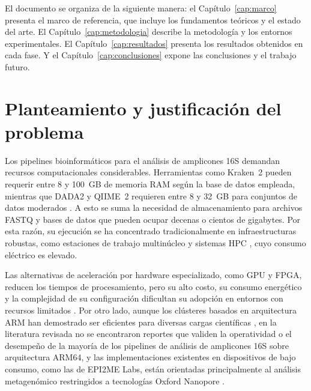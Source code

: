 \documentclass[12pt,oneside,spanish]{book}
\begin{document}
    El documento se organiza de la siguiente manera: el Capítulo~\ref{cap:marco} presenta el marco de referencia, que incluye los fundamentos teóricos y el estado del arte. El Capítulo~\ref{cap:metodologia} describe la metodología y los entornos experimentales. El Capítulo~\ref{cap:resultados} presenta los resultados obtenidos en cada fase. Y el Capítulo~\ref{cap:conclusiones} expone las conclusiones y el trabajo futuro.
    
    
    \section*{Planteamiento y justificación del problema}
    
    Los pipelines bioinformáticos para el análisis de amplicones 16S demandan recursos computacionales considerables. Herramientas como Kraken~2 \citep{wood2019kraken2, wood2024manual} pueden requerir entre 8 y 100~GB de memoria RAM según la base de datos empleada, mientras que DADA2 y QIIME~2 requieren entre 8 y 32~GB para conjuntos de datos moderados \citep{callahan2016dada2, bolyen2019qiime2}. A esto se suma la necesidad de almacenamiento para archivos FASTQ y bases de datos que pueden ocupar decenas o cientos de gigabytes. Por esta razón, su ejecución se ha concentrado tradicionalmente en infraestructuras robustas, como estaciones de trabajo multinúcleo y sistemas HPC \citep{seppey2025lemmi}, cuyo consumo eléctrico es elevado.
    
    Las alternativas de aceleración por hardware especializado, como GPU y FPGA, reducen los tiempos de procesamiento, pero su alto costo, su consumo energético y la complejidad de su configuración dificultan su adopción en entornos con recursos limitados \citep{robinson2021hardware}. Por otro lado, aunque los clústeres basados en arquitectura ARM han demostrado ser eficientes para diversas cargas científicas \citep{maqbool2015arm, warade2022}, en la literatura revisada no se encontraron reportes que validen la operatividad o el desempeño de la mayoría de los pipelines de análisis de amplicones 16S sobre arquitectura ARM64, y las implementaciones existentes en dispositivos de bajo consumo, como las de EPI2ME Labs, están orientadas principalmente al análisis metagenómico restringidos a tecnologías Oxford Nanopore \citep{ont2024wfmetagenomics}.
    \newpage
    
\end{document}
